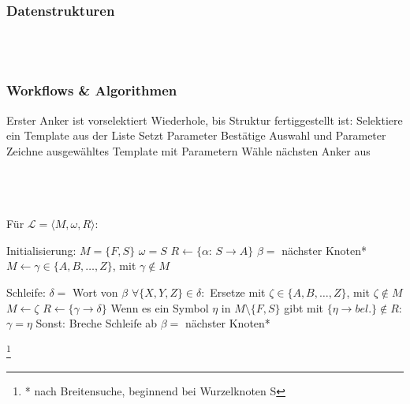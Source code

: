 \documentclass[11pt]{article}
\newcommand\blfootnote[1]{%
\begingroup
\renewcommand\thefootnote{}\footnote{#1}%
\addtocounter{footnote}{-1}%
\endgroup
}
\begin{document}
    \subsubsection{Datenstrukturen}
    \\~\\

    \subsubsection{Workflows \& Algorithmen}
    \begin{algorithm}[caption={Erstellen einer Verzweigungsstruktur}, label={alg1}]
Erster Anker ist vorselektiert
Wiederhole, bis Struktur fertiggestellt ist:
    Selektiere ein Template aus der Liste
    Setzt Parameter
    Bestätige Auswahl und Parameter
    Zeichne ausgewähltes Template mit Parametern
    Wähle nächsten Anker aus
    \end{algorithm}
    \\~\\~\\
    Für $\mathcal{L}=\langle M,\omega,R \rangle$:
    \begin{algorithm}[caption={Inferieren eines L-Systems aus einer Baumstruktur}, label={alg1}]
Initialisierung:
    $M=\{F,S\}$
    $\omega=S$
    $R \gets \{\alpha$: $S \rightarrow A\}$
    $\beta=$ nächster Knoten*
    $M \gets \gamma \in \{A,B,\dots,Z\}$, mit $\gamma \notin M$

Schleife:
    $\delta=$ Wort von $\beta$
    $\forall \{X,Y,Z\} \in \delta:$
        Ersetze mit $\zeta \in \{A,B,\dots,Z\}$, mit $\zeta \notin M$
        $M \gets \zeta$
    $R \gets \{\gamma\rightarrow\delta\}$
    Wenn es ein Symbol $\eta$ in $M\setminus\{F,S\}$ gibt mit $\{\eta \rightarrow bel.\} \notin R$:
        $\gamma=\eta$
    Sonst:
        Breche Schleife ab
    $\beta=$ nächster Knoten*
    \end{algorithm}
    \blfootnote{* nach Breitensuche, beginnend bei Wurzelknoten S}
\end{document}
